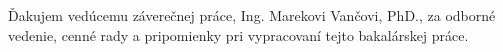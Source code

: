 Ďakujem vedúcemu záverečnej práce, Ing. Marekovi Vančovi, PhD., za odborné vedenie, cenné rady a pripomienky pri vypracovaní tejto bakalárskej práce.